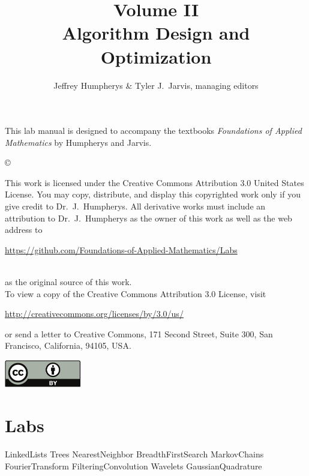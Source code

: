 \documentclass[opener-c,labs,red,nociteref]{HJnewsiambook}
\title{Volume II\\ Algorithm Design and Optimization}
\author{Jeffrey Humpherys \& Tyler J.~Jarvis, managing editors}
\begin{document}

\thispagestyle{empty} %
\maketitle
\thispagestyle{empty}
\frontmatter



\begin{thepreface} %

This lab manual is designed to accompany the textbooks \emph{Foundations of Applied Mathematics} by Humpherys and Jarvis.

\vfill
\copyright{This work is licensed under the Creative Commons Attribution 3.0 United States
License.  You may copy, distribute, and display this copyrighted work only if you give
credit to Dr.~J.~Humpherys. All derivative works must include an attribution to Dr.~J.~Humpherys as the owner of this work as well as the web address to
\\\centerline{\url{https://github.com/Foundations-of-Applied-Mathematics/Labs}}\\as the original source of this work.
\\To view a copy of the Creative Commons Attribution 3.0 License, visit
\\\centerline{\url{http://creativecommons.org/licenses/by/3.0/us/}} or send a letter to Creative Commons, 171 Second Street, Suite 300, San Francisco, California, 94105, USA.}

\vfill
\centering\includegraphics[height=1.2cm]{by.pdf}
\vfill
\end{thepreface}

\setcounter{tocdepth}{1}
\tableofcontents

\mainmatter %

\part{Labs}
{LinkedLists}
{Trees}
{NearestNeighbor}
{BreadthFirstSearch}
{MarkovChains}
{FourierTransform}
{FilteringConvolution}
{Wavelets}
{GaussianQuadrature}
\end{document}
